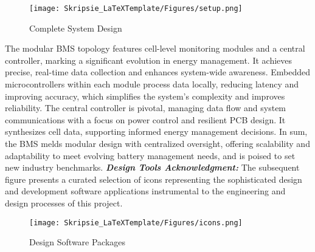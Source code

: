 \begin{figure}[h!]
\centering
\texttt{[image: Skripsie\_LaTeXTemplate/Figures/setup.png]}
\caption{Complete System Design}
\label{fig:setup_dsgn}
\end{figure}
\noindent
The modular BMS topology features cell-level monitoring modules and a central controller, marking a significant evolution in energy management. It achieves precise, real-time data collection and enhances system-wide awareness. Embedded microcontrollers within each module process data locally, reducing latency and improving accuracy, which simplifies the system's complexity and improves reliability.\newline\newline
\noindent
The central controller is pivotal, managing data flow and system communications with a focus on power control and resilient PCB design. It synthesizes cell data, supporting informed energy management decisions. In sum, the BMS melds modular design with centralized oversight, offering scalability and adaptability to meet evolving battery management needs, and is poised to set new industry benchmarks.\newline\newline
\noindent
\textbf{\emph{Design Tools Acknowledgment:}}\newline
\noindent
The subsequent figure presents a curated selection of icons representing the sophisticated design and development software applications instrumental to the engineering and design processes of this project.

\begin{figure}[h!]
\centering
\texttt{[image: Skripsie\_LaTeXTemplate/Figures/icons.png]}
\caption{Design Software Packages}
\label{fig:DSP}
\end{figure}

\vfill
